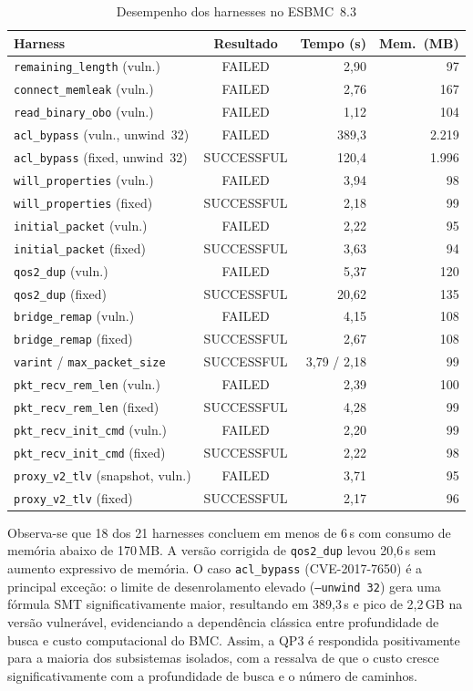 \documentclass[conference]{IEEEtran}
\begin{document}
\begin{table}[htbp]
\caption{Desempenho dos harnesses no ESBMC~8.3}
\label{tab:perf}
\centering
\scriptsize
\setlength{\tabcolsep}{3pt}
\begin{tabular}{lcrr}
\hline
Harness & Resultado & Tempo (s) & Mem.\ (MB) \\
\hline
\texttt{remaining\_length} (vuln.) & FAILED & 2,90 & 97 \\
\texttt{connect\_memleak} (vuln.) & FAILED & 2,76 & 167 \\
\texttt{read\_binary\_obo} (vuln.) & FAILED & 1,12 & 104 \\
\texttt{acl\_bypass} (vuln., unwind~32) & FAILED & 389,3 & 2.219 \\
\texttt{acl\_bypass} (fixed, unwind~32) & SUCCESSFUL & 120,4 & 1.996 \\
\texttt{will\_properties} (vuln.) & FAILED & 3,94 & 98 \\
\texttt{will\_properties} (fixed) & SUCCESSFUL & 2,18 & 99 \\
\texttt{initial\_packet} (vuln.) & FAILED & 2,22 & 95 \\
\texttt{initial\_packet} (fixed) & SUCCESSFUL & 3,63 & 94 \\
\texttt{qos2\_dup} (vuln.) & FAILED & 5,37 & 120 \\
\texttt{qos2\_dup} (fixed) & SUCCESSFUL & 20,62 & 135 \\
\texttt{bridge\_remap} (vuln.) & FAILED & 4,15 & 108 \\
\texttt{bridge\_remap} (fixed) & SUCCESSFUL & 2,67 & 108 \\
\texttt{varint} / \texttt{max\_packet\_size} & SUCCESSFUL & 3,79 / 2,18 & 99 \\
\texttt{pkt\_recv\_rem\_len} (vuln.) & FAILED & 2,39 & 100 \\
\texttt{pkt\_recv\_rem\_len} (fixed) & SUCCESSFUL & 4,28 & 99 \\
\texttt{pkt\_recv\_init\_cmd} (vuln.) & FAILED & 2,20 & 99 \\
\texttt{pkt\_recv\_init\_cmd} (fixed) & SUCCESSFUL & 2,22 & 98 \\
\texttt{proxy\_v2\_tlv} (snapshot, vuln.) & FAILED & 3,71 & 95 \\
\texttt{proxy\_v2\_tlv} (fixed) & SUCCESSFUL & 2,17 & 96 \\
\hline
\end{tabular}
\end{table}

Observa-se que 18 dos 21 harnesses concluem em menos de 6\,s com consumo de
mem\'oria abaixo de 170\,MB. A vers\~ao corrigida de \texttt{qos2\_dup} levou
20,6\,s sem aumento expressivo de mem\'oria. O caso \texttt{acl\_bypass}
(CVE-2017-7650) \'e a principal exce\c{c}\~ao: o limite de desenrolamento elevado
(\texttt{--unwind~32}) gera uma f\'ormula SMT significativamente maior,
resultando em 389,3\,s e pico de 2,2\,GB na vers\~ao vulner\'avel, evidenciando a
depend\^encia cl\'assica entre profundidade de busca e custo computacional do BMC.
Assim, a QP3 \'e respondida positivamente para a maioria dos subsistemas
isolados, com a ressalva de que o custo cresce significativamente com a
profundidade de busca e o n\'umero de caminhos.
\end{document}

